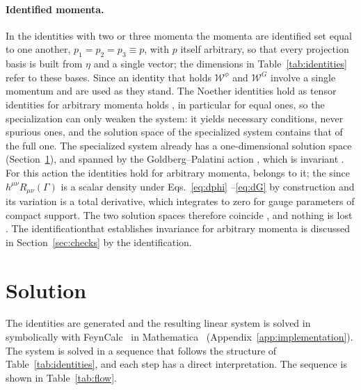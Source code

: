 \documentclass[prd,aps,preprint,superscriptaddress,nofootinbib,amsmath,amssymb,eqsecnum]{revtex4-2}
\newcommand{\W}{\mathcal{W}}
\providecommand{\DIFaddtex}[1]{{\protect\color{blue} \sf #1}} %
\providecommand{\DIFdeltex}[1]{{\protect\color{red} \scriptsize #1}} %
\providecommand{\DIFaddbegin}{} %
\providecommand{\DIFaddend}{} %
\providecommand{\DIFdelbegin}{} %
\providecommand{\DIFdelend}{} %
\providecommand{\DIFadd}[1]{\texorpdfstring{\DIFaddtex{#1}}{#1}} %
\providecommand{\DIFdel}[1]{\texorpdfstring{\DIFdeltex{#1}}{}} %
\begin{document}
\paragraph{\DIFadd{Identified momenta.}} \DIFaddend In the identities with two or three momenta the momenta are
\DIFdelbegin \DIFdel{identified}\DIFdelend \DIFaddbegin \DIFadd{set equal to one another}\DIFaddend , $p_1=p_2=p_3\equiv p$, \DIFaddbegin \DIFadd{with $p$ itself arbitrary, }\DIFaddend so that every
projection basis is built from $\eta$ and a single vector; the dimensions in
Table~\ref{tab:identities} refer to these bases. \DIFdelbegin \DIFdel{Since an identity
that holds }\DIFdelend \DIFaddbegin \DIFadd{$\W^{\phi}$ and $\W^{G}$ involve a single
momentum and are used as they stand. The Noether identities hold as tensor identities }\DIFaddend for
arbitrary momenta\DIFdelbegin \DIFdel{holds }\DIFdelend \DIFaddbegin \DIFadd{, }\DIFaddend in particular for equal ones, \DIFaddbegin \DIFadd{so }\DIFaddend the specialization can only weaken the
system: it yields necessary conditions, never spurious ones, and the solution space of the
specialized system contains that of the full one. The specialized system already has a
one-dimensional solution space (Section~\ref{sec:solution}), \DIFdelbegin \DIFdel{and }\DIFdelend \DIFaddbegin \DIFadd{spanned by }\DIFaddend the
Goldberg--Palatini action\DIFdelbegin \DIFdel{, which is invariant }\DIFdelend \DIFaddbegin \DIFadd{. For this action the identities hold }\DIFaddend for arbitrary momenta, \DIFdelbegin \DIFdel{belongs to it; the }\DIFdelend \DIFaddbegin \DIFadd{since
$h^{\mu\nu}R_{\mu\nu}(\Gamma)$ is a scalar density under
Eqs.~}\eqref{eq:dphi}\DIFadd{--}\eqref{eq:dG} \DIFadd{by construction and its variation is a total derivative,
which integrates to zero for gauge parameters of compact support. The }\DIFaddend two solution spaces
therefore coincide\DIFaddbegin \DIFadd{, }\DIFaddend and nothing is lost \DIFdelbegin \DIFdel{. The identificationthat establishes
invariance for arbitrary momenta is discussed in Section~\ref{sec:checks}}\DIFdelend \DIFaddbegin \DIFadd{by the identification}\DIFaddend .

\section{Solution}
\label{sec:solution}

The \DIFaddbegin \DIFadd{identities are generated and the }\DIFaddend resulting linear system is solved \DIFdelbegin \DIFdel{in }\DIFdelend \DIFaddbegin \DIFadd{symbolically with
FeynCalc~\cite{FeynCalc} in Mathematica~\cite{Mathematica} (Appendix~\ref{app:implementation}).
The system is solved in }\DIFaddend a sequence that follows the structure of
Table~\ref{tab:identities}, \DIFdelbegin \DIFdel{and each step has a direct interpretation. The sequence is }\DIFdelend shown in Table~\ref{tab:flow}.
\end{document}

